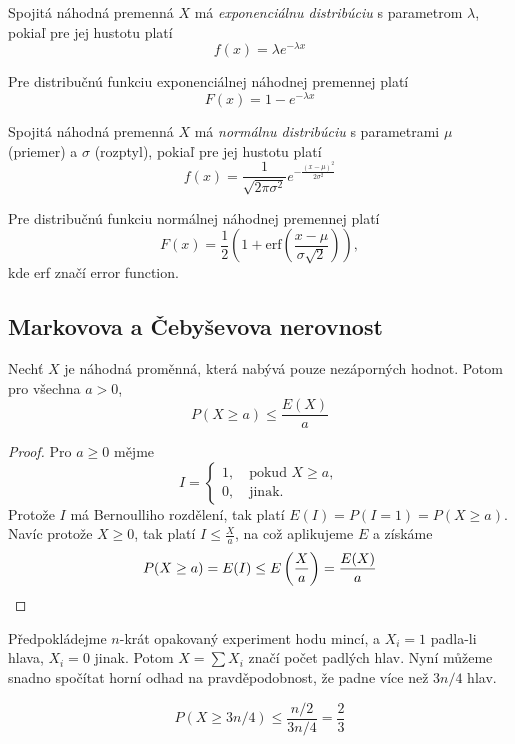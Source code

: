 \begin{definition}
    Spojitá náhodná premenná $X$ má {\em exponenciálnu distribúciu}
    s parametrom $\lambda$, pokiaľ pre jej hustotu platí
    \[
        f(x) = \lambda e^{-\lambda x}
    \]
\end{definition}

Pre distribučnú funkciu exponenciálnej náhodnej premennej platí
	\[
        F(x) = 1-e^{-\lambda x}
    \]

\begin{definition}
    Spojitá náhodná premenná $X$ má {\em normálnu distribúciu}
    s parametrami $\mu$ (priemer) a $\sigma$ (rozptyl), pokiaľ pre jej hustotu platí
    \[
        f(x) = \frac{1}{\sqrt{2 \pi \sigma^2}}e^{-\frac{(x-\mu)^2}{2\sigma^2}}
    \]
\end{definition}

Pre distribučnú funkciu normálnej náhodnej premennej platí
	\[
        F(x) = \frac{1}{2} \left( 1+ \text{erf}(\frac{x-\mu}{\sigma \sqrt{2}}) \right),
    \]
kde erf značí error function.

\subsection{Markovova a Čebyševova nerovnost}

\begin{theorem}
    Nechť $X$ je náhodná proměnná, která nabývá pouze nezáporných
    hodnot. Potom pro všechna $a > 0$,
    \[
       P(X \geq a) \leq \frac{E(X)}{a}
\]
\end{theorem}

\begin{proof}
    Pro $a \geq 0$ mějme
    \[
        I =
        \begin{cases}
            1, \quad \text{pokud } X \geq a, \\
            0, \quad \text{jinak.}
        \end{cases}
    \]
    Protože $I$ má Bernoulliho rozdělení, tak platí $E(I) = P(I = 1) = P(X \geq a)$.
    Navíc protože $X \geq 0$, tak platí $I \leq \frac{X}{a}$, na což
    aplikujeme $E$ a získáme
    \[
        P(X \geq a) = E(I) \leq E \left(\frac{X}{a} \right) = \frac{E(X)}{a}
        \qedhere
    \]
\end{proof}

\begin{example}
    Předpokládejme $n$-krát opakovaný experiment hodu mincí,
    a $X_i = 1$ padla-li hlava, $X_i = 0$ jinak.
    Potom $X = \sum X_i$ značí počet padlých hlav. Nyní můžeme snadno
    spočítat horní odhad na pravděpodobnost, že padne více než $3n/4$
    hlav.

    \[
        P(X \geq 3n/4) \leq \frac{n/2}{3n/4} = \frac{2}{3}
    \]
\end{example}

